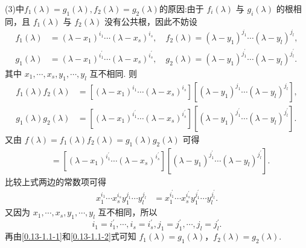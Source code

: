 \documentclass[../../main.tex]{subfiles}%
\begin{document}
\begin{remark}
(3)中$f_1(\lambda)=g_1(\lambda),f_2(\lambda)=g_2(\lambda)$的原因:由于 $f_i(\lambda)$ 与 $g_i(\lambda)$ 的根相同，且 $f_1(\lambda)$ 与 $f_2(\lambda)$ 没有公共根，因此不妨设
\begin{align}
f_1(\lambda)&=(\lambda - x_1)^{i_1}\cdots(\lambda - x_s)^{i_s}, \quad f_2(\lambda)=(\lambda - y_1)^{j_1}\cdots(\lambda - y_l)^{j_l},\label{0.13-1.1-1}
\\
g_1(\lambda)&=(\lambda - x_1)^{i_{1}^{\prime}}\cdots(\lambda - x_s)^{i_{s}^{\prime}}, \quad g_2(\lambda)=(\lambda - y_1)^{j_{1}^{\prime}}\cdots(\lambda - y_l)^{j_{l}^{\prime}}.\label{0.13-1.1-2}
\end{align}
其中 $x_1,\cdots,x_s,y_1,\cdots,y_l$ 互不相同. 则
\begin{align*}
f_1(\lambda)f_2(\lambda)&=[(\lambda - x_1)^{i_1}\cdots(\lambda - x_s)^{i_s}][(\lambda - y_1)^{j_1}\cdots(\lambda - y_l)^{j_l}],\\
g_1(\lambda)g_2(\lambda)&=[(\lambda - x_1)^{i_{1}^{\prime}}\cdots(\lambda - x_s)^{i_{s}^{\prime}}][(\lambda - y_1)^{j_{1}^{\prime}}\cdots(\lambda - y_l)^{j_{l}^{\prime}}].
\end{align*}
又由 $f(\lambda)=f_1(\lambda)f_2(\lambda)=g_1(\lambda)g_2(\lambda)$ 可得
\begin{align*}
[(\lambda - x_1)^{i_1}\cdots(\lambda - x_s)^{i_s}][(\lambda - y_1)^{j_1}\cdots(\lambda - y_l)^{j_l}]&=[(\lambda - x_1)^{i_{1}^{\prime}}\cdots(\lambda - x_s)^{i_{s}^{\prime}}][(\lambda - y_1)^{j_{1}^{\prime}}\cdots(\lambda - y_l)^{j_{l}^{\prime}}].
\end{align*}
比较上式两边的常数项可得
\begin{align*}
x_1^{i_1}\cdots x_s^{i_s}y_1^{j_1}\cdots y_l^{j_l}&=x_1^{i_{1}^{\prime}}\cdots x_s^{i_{s}^{\prime}}y_1^{j_{1}^{\prime}}\cdots y_l^{j_{l}^{\prime}}.
\end{align*}
又因为 $x_1,\cdots,x_s,y_1,\cdots,y_l$ 互不相同，所以
\[i_1 = i_{1}^{\prime},\cdots,i_s = i_{s}^{\prime},j_1 = j_{1}^{\prime},\cdots,j_l = j_{l}^{\prime}.\]
再由\eqref{0.13-1.1-1}和\eqref{0.13-1.1-2}式可知 $f_1(\lambda)=g_1(\lambda)$，$f_2(\lambda)=g_2(\lambda)$. 
\end{remark}
\end{document}
